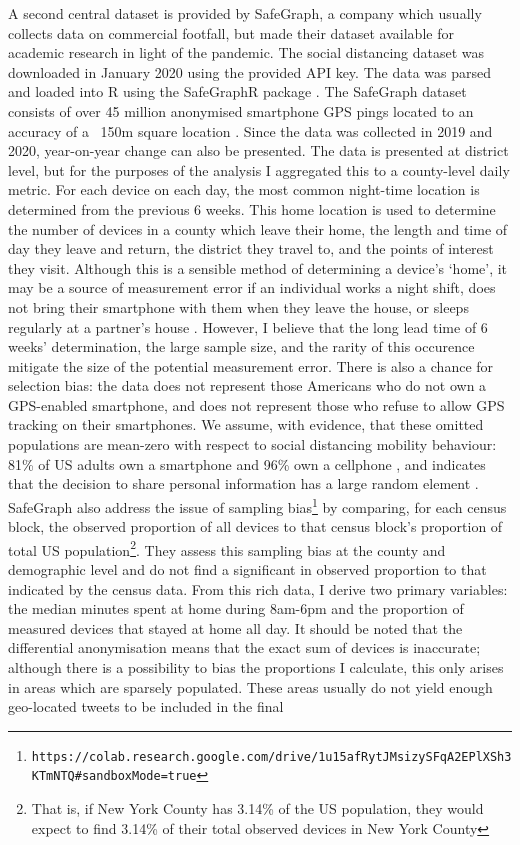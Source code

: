 \documentclass{article}
\begin{document}
A second central dataset is provided by SafeGraph, a company which usually collects data on commercial footfall, but made their dataset available for academic research in light of the pandemic. The social distancing dataset was downloaded in January 2020 using the provided API key. The data was parsed and loaded into R using the SafeGraphR package \parencite{huntington-kleinSafeGraphR2020}. The SafeGraph dataset consists of over 45 million anonymised smartphone GPS pings located to an accuracy of a ~150m square location \parencite{safegraphinc.SocialDistancingMetrics2020}. Since the data was collected in 2019 and 2020, year-on-year change can also be presented. The data is presented at district level, but for the purposes of the analysis I aggregated this to a county-level daily metric. For each device on each day, the most common night-time location is determined from the previous 6 weeks. This home location is used to determine the number of devices in a county which leave their home, the length and time of day they leave and return, the district they travel to, and the points of interest they visit. Although this is a sensible method of determining a device's `home', it may be a source of measurement error if an individual works a night shift, does not bring their smartphone with them when they leave the house, or sleeps regularly at a partner's house \parencite{chiouSocialDistancingInternet2020}. However, I believe that the long lead time of 6 weeks' determination, the large sample size, and the rarity of this occurence mitigate the size of the potential measurement error. There is also a chance for selection bias: the data does not represent those Americans who do not own a GPS-enabled smartphone, and does not represent those who refuse to allow GPS tracking on their smartphones. We assume, with evidence, that these omitted populations are mean-zero with respect to social distancing mobility behaviour: 81\% of US adults own a smartphone and 96\% own a cellphone \parencite{pewresearchcenterDemographicsMobileDevice2019}, and \parencite{atheyDigitalPrivacyParadox2017} indicates that the decision to share personal information has a large random element \parencite{chiouSocialDistancingInternet2020}. SafeGraph also address the issue of sampling bias\footnote{\tt{https://colab.research.google.com/drive/1u15afRytJMsizySFqA2EPlXSh3KTmNTQ\#sandboxMode=true}} by comparing, for each census block, the observed proportion of all devices to that census block's proportion of total US population\footnote{That is, if New York County has 3.14\% of the US population, they would expect to find 3.14\% of their total observed devices in New York County}. They assess this sampling bias at the county and demographic level and do not find a significant in observed proportion to that indicated by the census data. From this rich data, I derive two primary variables: the median minutes spent at home during 8am-6pm and the proportion of measured devices that stayed at home all day.  It should be noted that the differential anonymisation means that the exact sum of devices is inaccurate; although there is a possibility to bias the proportions I calculate, this only arises in areas which are sparsely populated. These areas usually do not yield enough geo-located tweets to be included in the final 
\end{document}
